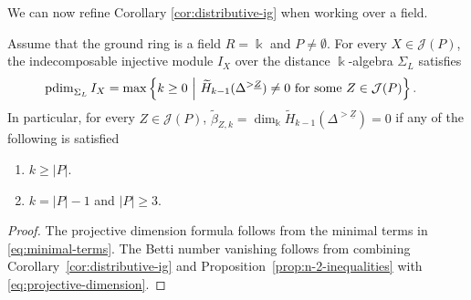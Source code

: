 \documentclass[a4paper,leqno]{amsart}
\begin{document}
We can now refine Corollary \ref{cor:distributive-ig} when working over a field.
\begin{cor}\label{cor:SigmaJ(P) is IG} Assume that the ground ring is a field $R=\Bbbk$ and $P\neq\emptyset$.
For every $X\in\mathcal J(P)$, the indecomposable injective module $I_X$ over the distance $\Bbbk$-algebra $\Sigma_L$ satisfies
\begin{align}
 \operatorname{pdim}_{\Sigma_L} I_X
 &=\max\left\{k\geq0\ \middle|\
 \widetilde H_{k-1}(\Delta^{>\underline{Z}})\neq0
 \text{ for some }Z\in\mathcal J(P)\right\}.
 \label{eq:projective-dimension}
\end{align}
In particular, for every $Z\in\mathcal J(P)$, $ \widetilde\beta_{Z,k} =\dim_{\Bbbk}\widetilde H_{k-1}(\Delta^{>\underline{Z}})=0$ if any of the following is satisfied
\begin{enumerate}
    \item $k\ge |P|$.
    \item $k=|P|-1$ and $|P|\ge 3$. 
\end{enumerate}
\end{cor}
\begin{proof}
The projective dimension formula follows from the minimal terms in \eqref{eq:minimal-terms}. 
The Betti number vanishing follows from combining Corollary~\ref{cor:distributive-ig} and Proposition~\ref{prop:n-2-inequalities} with \eqref{eq:projective-dimension}.
\end{proof}
\end{document}
